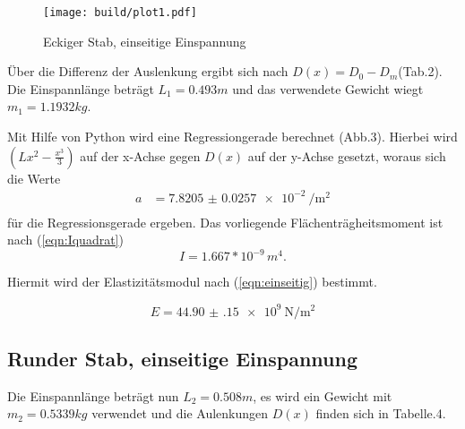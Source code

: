 \begin{figure}[h]
  \centering
  \texttt{[image: build/plot1.pdf]}
  \caption{Eckiger Stab, einseitige Einspannung}
  \label{fig:plot1}
\end{figure}

Über die Differenz der Auslenkung  ergibt sich nach
$D(x) = D_0 - D_m$(Tab.2). Die Einspannlänge beträgt $L_1 = 0.493m$ und
das verwendete Gewicht wiegt $m_1 = 1.1932 kg$.





Mit Hilfe von Python wird eine Regressiongerade berechnet (Abb.3).
Hierbei wird $(Lx^2- \frac{x^3}{3})$ auf der x-Achse gegen $D(x)$ auf der y-Achse
gesetzt, woraus sich die Werte
\begin{align*}
  a &= \SI{7.8205(257)e-2}{\per\square\meter} \\
\end{align*}
für die Regressionsgerade ergeben.
\newline
Das vorliegende Flächenträgheitsmoment ist nach (\ref{eqn:Iquadrat})
\begin{equation*}
  I = 1.667* 10^{-9}\, m^4.
\end{equation*}

Hiermit wird der Elastizitätsmodul nach (\ref{eqn:einseitig}) bestimmt.

\begin{equation*}
  E = \SI{44.90(15)e9}{\newton\per\square\meter}
\end{equation*}
\newpage






\subsection{Runder Stab, einseitige Einspannung}
Die Einspannlänge beträgt nun $L_2 = 0.508m$, es wird ein Gewicht
mit $m_2 = 0.5339 kg $ verwendet und die Aulenkungen $D(x)$ finden
sich in Tabelle.4.

